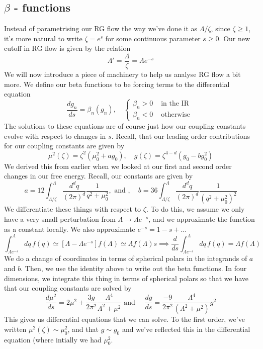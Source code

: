 \subsection{$ \beta$ - functions}
Instead of parametrising our RG flow 
the way we've done it as $ \Lambda / \zeta$,
since  $ \zeta \geq 1 $, it's more natural 
to write $ \zeta  = e^{ s } $ for some continuous parameter $ s \geq 0 $. 
Our new cutoff in RG flow is given by the relation 
\[
\Lambda ' = \frac{ \Lambda }{ \zeta  } = \Lambda e^{ - s }
\] We will now introduce a piece of 
machinery to help us analyse 
RG flow a bit more. We define our beta functions to be forcing 
terms to the differential equation 
\[
\frac{ d g_ n }{ ds } = \beta_ n ( g _ n ) , \quad \begin{cases}
	\beta_ n > 0 & \text{ in the IR } \\
	\beta _ n < 0 & \text{ otherwise }
\end{cases}
\] The solutions to these equations are 
of course just how our coupling constants evolve 
with respect to changes in $ s $. Recall, that our leading order 
contributions for our coupling constants are given by 
\[
\mu ^ 2 ( \zeta ) = \zeta ^ 2 ( \mu _ 0 ^ 2  + ag_0 ), \quad
g ( \zeta ) = \zeta ^{ 4 - d  } ( g_0 - b g_0^ 2 ) 
\] We derived this from earlier when we looked 
at our first and second order 
changes in our free energy. Recall, our constants are given by 
\[
a = 12 \int_{ \Lambda / \zeta } ^ \Lambda \frac{  d^ d q }{ ( 2 \pi ) ^ d }
\frac{1}{q ^ 2 + \mu _ 0 ^ 2}, \text{ and } , \quad
b = 36 \int _{ \Lambda / \zeta } ^  \Lambda \frac{ d ^ d q }{ 
( 2 \pi ) ^ d  } \frac{1}{( q ^ 2 + \mu _ 0 ^ 2 ) ^ 2 }
\] We differentiate these things with respect to $ \zeta $. 
To do this, we assume we only have a very small perturbation
from $ \Lambda \to \Lambda e^{ -s } $, and we approximate 
the function as a constant locally. We also approximate 
$ e ^{ - s}  = 1 - s + \dots $
\[
\int _{ \Lambda e ^{ - s} } ^ \Lambda dq \, f ( q) 
\simeq \left[  \Lambda - \Lambda e^{ - s}  \right] f ( \Lambda ) 
\simeq \Lambda f ( \Lambda ) s \implies 
\frac{ d }{ ds } \int _{ \Lambda e ^{ - s} } ^ \Lambda 
dq \, f ( q ) = \Lambda f ( \Lambda ) 
\]  We do a change of coordinates 
in terms of spherical polars in the integrands 
of $ a $ and $ b  $. Then, we use the identity above 
to write out the beta functions. In four dimensions, we integrate this 
thing in terms of spherical polars so that 
we have that our coupling constants are solved by 
\[
\frac{d \mu ^ 2 }{ ds } = 2 \mu ^ 2 + \frac{ 3g }{ 2 \pi ^ 2 } 
\frac{ \Lambda ^ 4 }{ \Lambda ^ 2 + \mu ^ 2  } \text{ and } \quad
\frac{ dg }{ ds } = \frac{ - 9 }{ 2 \pi ^ 2 } \frac{ \Lambda ^ 4 }{
( \Lambda ^ 2 + \mu ^ 2 ) } g ^ 2  
\] This gives us differential equations that 
we can solve. To the first order, we've written  
$ \mu ^ 2 ( \zeta ) \sim \mu ^ 2 _ 0 $, and that $ g  \sim g_0 $ and we've 
reflected this in the differential equation (where intially we had $ \mu ^ 2 _ 0 $. 

